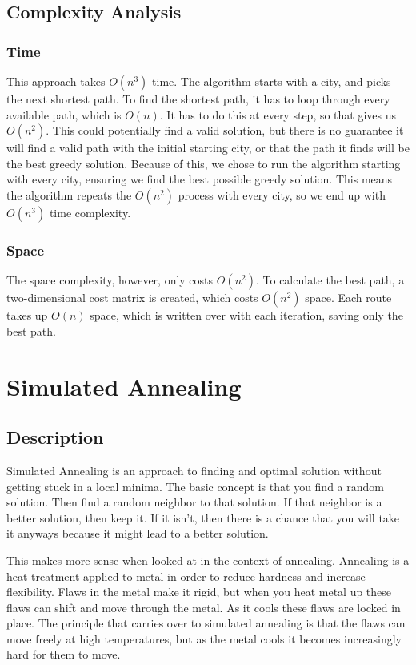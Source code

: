 \documentclass{article}
\def\bigO#1{$O(#1)$}
\begin{document}
\begin{multicols}{2}
    \subsection{Complexity Analysis}
    \subsubsection{Time}
    This approach takes \bigO{n^3} time. The algorithm starts with a city, and picks the next shortest path. To find the shortest path, it has to loop through every available path, which is \bigO{n}. It has to do this at every step, so that gives us \bigO{n^2}. This could potentially find a valid solution, but there is no guarantee it will find a valid path with the initial starting city, or that the path it finds will be the best greedy solution. Because of this, we chose to run the algorithm starting with every city, ensuring we find the best possible greedy solution. This means the algorithm repeats the \bigO{n^2} process with every city, so we end up with \bigO{n^3} time complexity.
    
    \subsubsection{Space}

    The space complexity, however, only costs \bigO{n^2}. To calculate the best path, a two-dimensional cost matrix is created, which costs \bigO{n^2} space. Each route takes up \bigO{n} space, which is written over with each iteration, saving only the best path.

    \section{Simulated Annealing}
    \subsection{Description}

        Simulated Annealing is an approach to finding and optimal solution without getting stuck in a local minima. The basic concept is that you find a random solution. Then find a random neighbor to that solution. If that neighbor is a better solution, then keep it. If it isn’t, then there is a chance that you will take it anyways because it might lead to a better solution. 

        This makes more sense when looked at in the context of annealing. Annealing is a heat treatment applied to metal in order to reduce hardness and increase flexibility. Flaws in the metal make it rigid, but when you heat metal up these flaws can shift and move through the metal. As it cools these flaws are locked in place. The principle that carries over to simulated annealing is that the flaws can move freely at high temperatures, but as the metal cools it becomes increasingly hard for them to move.
        

\end{multicols}
\end{document}
